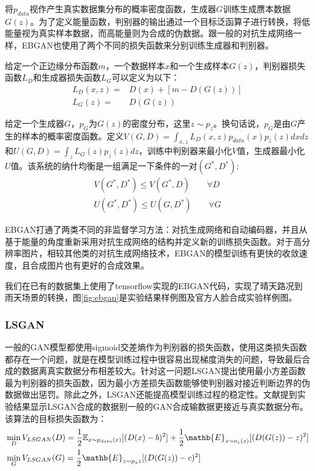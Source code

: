 将$p_{data}$视作产生真实数据集分布的概率密度函数，生成器$G$训练生成赝本数据$G(z)$。为了定义能量函数，判别器的输出通过一个目标泛函算子进行转换，将低能量视为真实样本数据，而高能量则为合成的伪数据。跟一般的对抗生成网络一样，EBGAN也使用了两个不同的损失函数来分别训练生成器和判别器。

给定一个正边缘分布函数$m$，一个数据样本$x$和一个生成样本$G(z)$，判别器损失函数$L_D$和生成器损失函数$L_G$可以定义为以下：
\begin{align*}
    L_D(x, z) = & D(x) + [m - D(G(z))] \\
    L_G(z) = & D(G(z))
\end{align*}

给定一个生成器$G$，$p_G$为$G(z)$的密度分布，这里$z\sim p_z$。换句话说，$p_G$是由$G$产生的样本的概率密度函数。定义$V(G,D)=\int_{x,z}L_D(x,z)p_{data}(x)p_z(z)dxdz$和$U(G,D)=\int_zL_G(z)p_z(z)dz$，训练中判别器来最小化$V$值，生成器最小化$U$值。该系统的纳什均衡是一组满足一下条件的一对$(G^*,D^*)$:
\begin{align*}
    V(G^*,D^*) \leq V(G^*,D) \quad\quad \forall D \\
    U(G^*,D^*) \leq U(G,D^*) \quad\quad \forall G
\end{align*}

EBGAN打通了两类不同的非监督学习方法：对抗生成网络和自动编码器，并且从基于能量的角度重新采用对抗生成网络的结构并定义新的训练损失函数。对于高分辨率图片，相较其他类的对抗生成网络技术，EBGAN的模型训练有更快的收敛速度，且合成图片也有更好的合成效果。

我们在已有的数据集上使用了tensorflow实现的EBGAN代码\cite{ebgan-github}，实现了晴天路况到雨天场景的转换，图\ref{fig:ebgan}是实验结果样例图及官方人脸合成实验样例图。

\subsubsection{LSGAN}

 一般的GAN模型都使用sigmoid交差熵作为判别器的损失函数，使用这类损失函数都存在一个问题，就是在模型训练过程中很容易出现梯度消失的问题，导致最后合成的数据离真实数据分布相差较大。针对这一问题LSGAN提出使用最小方差函数最为判别器的损失函数，因为最小方差损失函数能够使判别器对接近判断边界的伪数据做出惩罚。除此之外，LSGAN还能提高模型训练过程的稳定性。文献\cite{LSGAN}提到实验结果显示LSGAN合成的数据别一般的GAN合成输数据更接近与真实数据分布。该算法的目标损失函数为：
\begin{align*}
    & \min_D V_{LSGAN}(D)=\frac{1}{2}\mathbb{E}_{x\sim p_{data}(x)}[(D(x)-b)^2]+\frac{1}{2}\mathb{E}_{z\sim o_z(z)}[(D(G(z))-z)^2] \\
    & \min_G V_{LSGAN}(G)=\frac{1}{2}\mathb{E}_{z\sim p_z{z}}[(D(G(z))-c)^2]
\end{align*}

